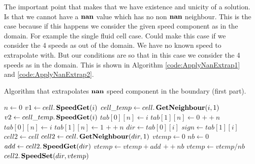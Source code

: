 The important point that makes that we have existence and unicity of a solution.
Is that we cannot have a $\mathop{\textbf{nan}}$ value which has no non $\mathop{\textbf{nan}}$ neighbour.
This is the case because if this happens we consider the given speed component as in the domain.
For example the single fluid cell case. Could make this case if we consider the 4 speeds as out of the domain.
We have no known speed to extrapolate with. But our conditions are so that in this case we consider the 4 speeds as in the domain.
This is shown in Algorithm \ref{code:ApplyNanExtrap1} and \ref{code:ApplyNanExtrap2}.
\begin{algorithm}
\caption{Algorithm that extrapolates $\mathop{\textbf{nan}}$ speed component in the boundary (first part).}
\label{code:ApplyNanExtrap1}
\begin{algorithmic}[1]
	\State $n \gets 0$
	\State $v1 \gets cell.\mathop{\textbf{SpeedGet}}(i)$
	\State $cell\_temp \gets cell.\mathop{\textbf{GetNeighbour}}(i,1)$
	\State $v2 \gets cell\_temp.\mathop{\textbf{SpeedGet}}(i)$
		\State $tab[0][n] \gets i$
		\State $tab[1][n] \gets 0$
		\State $++n$
	\EndIf
		\State $tab[0][n]\gets i$
		\State $tab[1][n] \gets 1$
		\State $++n$
	\EndIf
	\EndFor
	 
	\Return
	\EndIf
	 
	\State $dir \gets tab[0][i]$
	\State $sign \gets tab[1][i]$
	\State $cell2\gets cell$
	\State $cell2 \gets cell.\mathop{\textbf{GetNeighbour}}(dir,1)$
	\EndIf
	\State $vtemp \gets 0$
	\State $nb \gets 0$
		\State $add \gets cell2.\mathop{\textbf{SpeedGet}}(dir)$
			\State $vtemp \gets vtemp+add $
			\State $++nb$
		\EndIf
		\EndFor
	\EndFor
		\State $vtemp \gets vtemp/nb$ 
	\EndIf
	\State $cell2.\mathop{\textbf{SpeedSet}}(dir,vtemp)$
	\EndFor
	\end{algorithmic}
\end{algorithm}
